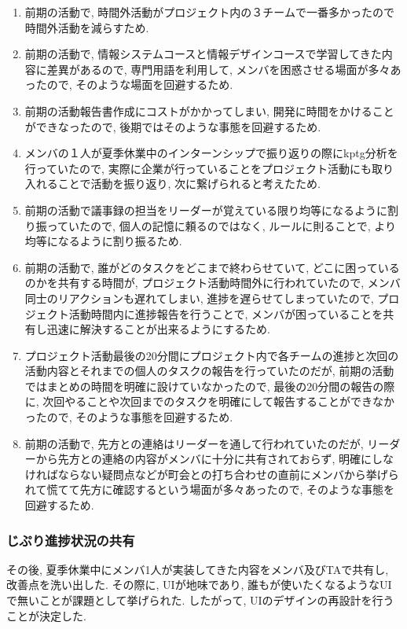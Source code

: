 \begin{enumerate}
    \item 前期の活動で, 時間外活動がプロジェクト内の３チームで一番多かったので時間外活動を減らすため.
    \item 前期の活動で, 情報システムコースと情報デザインコースで学習してきた内容に差異があるので, 専門用語を利用して, メンバを困惑させる場面が多々あったので, そのような場面を回避するため.
    \item 前期の活動報告書作成にコストがかかってしまい, 開発に時間をかけることができなったので, 後期ではそのような事態を回避するため.
    \item メンバの１人が夏季休業中のインターンシップで振り返りの際にkptg分析を行っていたので, 実際に企業が行っていることをプロジェクト活動にも取り入れることで活動を振り返り, 次に繋げられると考えたため.
    \item 前期の活動で議事録の担当をリーダーが覚えている限り均等になるように割り振っていたので, 個人の記憶に頼るのではなく, ルールに則ることで, より均等になるように割り振るため.
    \item 前期の活動で, 誰がどのタスクをどこまで終わらせていて, どこに困っているのかを共有する時間が, プロジェクト活動時間外に行われていたので, メンバ同士のリアクションも遅れてしまい, 進捗を遅らせてしまっていたので,
          プロジェクト活動時間内に進捗報告を行うことで, メンバが困っていることを共有し迅速に解決することが出来るようにするため.
    \item プロジェクト活動最後の20分間にプロジェクト内で各チームの進捗と次回の活動内容とそれまでの個人のタスクの報告を行っていたのだが, 前期の活動ではまとめの時間を明確に設けていなかったので,
          最後の20分間の報告の際に, 次回やることや次回までのタスクを明確にして報告することができなかったので, そのような事態を回避するため.
    \item 前期の活動で, 先方との連絡はリーダーを通して行われていたのだが, リーダーから先方との連絡の内容がメンバに十分に共有されておらず,
          明確にしなければならない疑問点などが町会との打ち合わせの直前にメンバから挙げられて慌てて先方に確認するという場面が多々あったので, そのような事態を回避するため.
\end{enumerate}

\subsubsection{じぷり進捗状況の共有}
その後, 夏季休業中にメンバ1人が実装してきた内容をメンバ及びTAで共有し, 改善点を洗い出した.
その際に, UIが地味であり, 誰もが使いたくなるようなUIで無いことが課題として挙げられた. したがって, UIのデザインの再設計を行うことが決定した.

